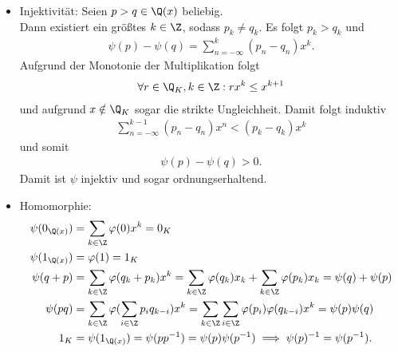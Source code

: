 \begin{solution}
\begin{itemize}
  \item Injektivität: Seien $p > q \in \Q(x)$ beliebig. \\
  Dann existiert ein größtes $k \in \Z$, sodass $p_k \neq q_k$. Es folgt $p_k > q_k$ und
  \begin{align*}
    \psi(p) - \psi(q) = \sum_{n = -\infty}^k(p_n - q_n)x^k.
  \end{align*}
  Aufgrund der Monotonie der Multiplikation folgt
  \begin{align*}
    \forall r \in \Q_K, k \in \Z: rx^k \leq x^{k+1}
  \end{align*}
  und aufgrund $x \notin \Q_K$ sogar die strikte Ungleichheit.
  Damit folgt induktiv
  \begin{align*}
    \sum_{n = -\infty}^{k - 1} (p_n - q_n)x^n < (p_k - q_k)x^k
  \end{align*}
  und somit
  \begin{align*}
    \psi(p) - \psi(q) > 0.
  \end{align*}
  Damit ist $\psi$ injektiv und sogar ordnungserhaltend.
  \item Homomorphie:
  \begin{align*}
    \psi(0_{\Q(x)}) &= \sum_{k \in \Z}\varphi(0)x^k = 0_K \\
    \psi(1_{\Q(x)}) &= \varphi(1) = 1_K \\
    \psi(q + p) &= \sum_{k \in \Z}\varphi(q_k + p_k)x^k =
    \sum_{k \in \Z}\varphi(q_k)x_k + \sum_{k \in \Z}\varphi(p_k)x_k
    = \psi(q) + \psi(p) \\
    \psi(pq) &= \sum_{k \in \Z}\varphi(\sum_{i \in \Z}p_iq_{k-i})x^k =
    \sum_{k \in \Z}\sum_{i \in \Z}\varphi(p_i)\varphi(q_{k-i})x^k
    = \psi(p)\psi(q) \\
    1_K &= \psi(1_{\Q(x)}) = \psi(pp^{-1}) = \psi(p)\psi(p^{-1})
    \implies \psi(p)^{-1} = \psi(p^{-1}).
  \end{align*}
\end{itemize}
\end{solution}
